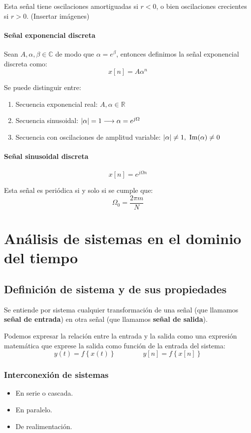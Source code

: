 \documentclass[a4paper]{book}
\begin{document}
Esta señal tiene oscilaciones amortiguadas si $r<0$, o bien oscilaciones crecientes si $r>0$. (Insertar imágenes)

\subsubsection{Señal exponencial discreta}
Sean $A,\alpha ,\beta \in \mathbb{C}$ de modo que $\alpha = e^\beta $, entonces definimos la señal exponencial discreta como: \[x[n] = A\alpha ^n\]

Se puede distinguir entre:
\begin{enumerate}
\item Secuencia exponencial real: $A, \alpha \in \mathbb{R}$
\item Secuencia sinusoidal: $\abs{\alpha} = 1 \longrightarrow \alpha = e^{j\Omega}$
\item Secuencia con oscilaciones de amplitud variable: $\abs{\alpha} \not =1,\ \Im(\alpha) \not =0$
\end{enumerate}

\subsubsection{Señal sinusoidal discreta}
\[x[n] = e^{j\Omega n}\]

Esta señal es periódica si y solo si se cumple que: \[\Omega _0 = \frac{2\pi m}{N}\]

\chapter{Análisis de sistemas en el dominio del tiempo}

\section{Definición de sistema y de sus propiedades}
Se entiende por sistema cualquier transformación de una señal (que llamamos \textbf{señal de entrada}) en otra señal (que llamamos \textbf{señal de salida}).

Podemos expresar la relación entre la entrada y la salida como una expresión matemática que exprese la salida como función de la entrada del sistema:
\[y(t) = f\left\lbrace x(t) \right\rbrace \qquad \qquad y[n] = f\left\lbrace x[n] \right\rbrace\]

\subsection{Interconexión de sistemas}
\begin{itemize}
	\item En serie o cascada.
	\item En paralelo.
	\item De realimentación.
\end{itemize}
\end{document}
